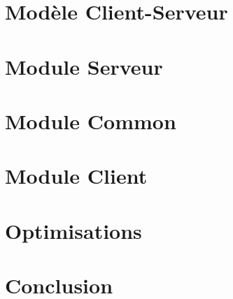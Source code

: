 \documentclass{article}
\begin{document}
\section{Modèle Client-Serveur}


\section{Module Serveur}


\section{Module Common}


\section{Module Client}


\section{Optimisations}


\section{Conclusion}
\end{document}

